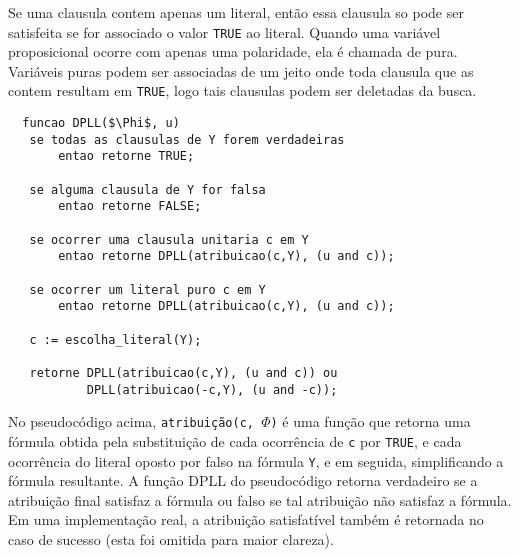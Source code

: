 Se uma clausula contem apenas um literal, então essa clausula so pode ser satisfeita se for associado o valor
\texttt{TRUE} ao literal. Quando uma variável proposicional ocorre com apenas uma polaridade, ela é chamada de pura. Variáveis puras
podem ser associadas de um jeito onde toda clausula que as contem resultam em \texttt{TRUE}, logo tais clausulas podem
ser deletadas da busca.
\begin{lstlisting}
  funcao DPLL($\Phi$, u)
   se todas as clausulas de Y forem verdadeiras 
       entao retorne TRUE;
       
   se alguma clausula de Y for falsa
       entao retorne FALSE;
       
   se ocorrer uma clausula unitaria c em Y
       entao retorne DPLL(atribuicao(c,Y), (u and c));
       
   se ocorrer um literal puro c em Y
       entao retorne DPLL(atribuicao(c,Y), (u and c));
       
   c := escolha_literal(Y);
   
   retorne DPLL(atribuicao(c,Y), (u and c)) ou
           DPLL(atribuicao(-c,Y), (u and -c));
\end{lstlisting}

 No pseudocódigo acima, \texttt{atribuição(c, $\Phi$)} é uma função que retorna uma fórmula obtida pela substituição de cada ocorrência
 de \texttt{c} por \texttt{TRUE}, e cada ocorrência do literal oposto por falso na fórmula \texttt{Y}, e em seguida, simplificando a fórmula resultante.
 A função DPLL do pseudocódigo retorna verdadeiro se a atribuição final satisfaz a fórmula ou falso se tal atribuição não satisfaz 
 a fórmula. Em uma implementação real, a atribuição satisfatível também é retornada no caso de sucesso (esta foi omitida para maior clareza).